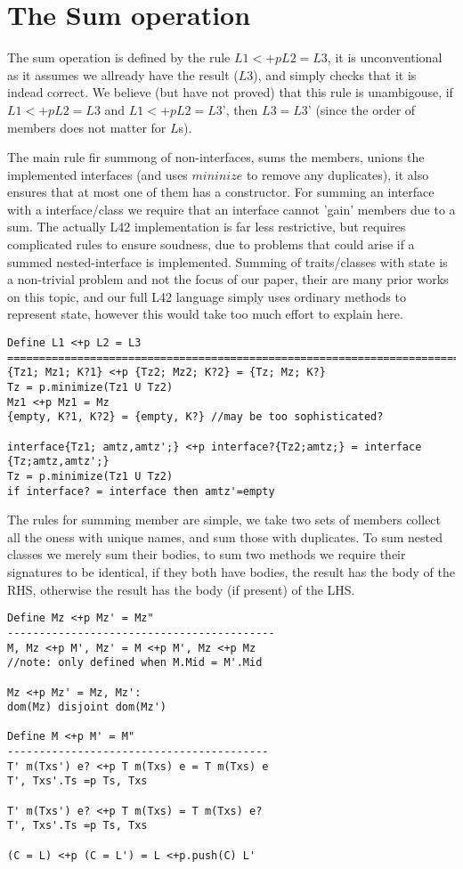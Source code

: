 \section{The Sum operation}

The sum operation is defined by the rule $L1 <+p L2 = L3$, it is unconventional as it assumes we allready have the result ($L3$), and simply checks that it is indead correct.
We believe (but have not proved) that this rule is unambigouse, if $L1 <+ p L2 = L3$ and $L1 <+ p L2 = L3’$, then $L3 = L3’$ (since the order of members does not matter for $L$s).

The main rule fir summong of non-interfaces, sums the members, unions the implemented interfaces (and uses $mininize$ to remove any duplicates), it also ensures that at most one of them has a constructor.
For summing an interface with a interface/class we require that an interface cannot ’gain’ members due to a sum. The actually L42 implementation is far less restrictive, but requires complicated rules to ensure soudness, due to problems that could arise if a summed nested-interface is implemented.
Summing of traits/classes with state is a non-trivial problem and not the focus of our paper, their are many prior works on this topic, and our full L42 language simply uses ordinary methods to represent state, however this would take too much effort to explain here.


\begin{verbatim}
Define L1 <+p L2 = L3
========================================================================================
{Tz1; Mz1; K?1} <+p {Tz2; Mz2; K?2} = {Tz; Mz; K?}
Tz = p.minimize(Tz1 U Tz2)
Mz1 <+p Mz1 = Mz
{empty, K?1, K?2} = {empty, K?} //may be too sophisticated?

interface{Tz1; amtz,amtz';} <+p interface?{Tz2;amtz;} = interface {Tz;amtz,amtz';}
Tz = p.minimize(Tz1 U Tz2)
if interface? = interface then amtz'=empty
\end{verbatim}

The rules for summing member are simple, we take two sets of members collect all the oness with unique names, and sum those with duplicates.
To sum nested classes we merely sum their bodies, to sum two methods we require their signatures to be identical, if they both have bodies, the result has the body of the RHS, otherwise the result has the body (if present) of the LHS.
\begin{verbatim}
Define Mz <+p Mz' = Mz"
------------------------------------------
M, Mz <+p M', Mz' = M <+p M', Mz <+p Mz
//note: only defined when M.Mid = M'.Mid

Mz <+p Mz' = Mz, Mz':
dom(Mz) disjoint dom(Mz')

Define M <+p M' = M"
-----------------------------------------
T' m(Txs') e? <+p T m(Txs) e = T m(Txs) e
T', Txs'.Ts =p Ts, Txs

T' m(Txs') e? <+p T m(Txs) = T m(Txs) e?
T', Txs'.Ts =p Ts, Txs

(C = L) <+p (C = L') = L <+p.push(C) L'
\end{verbatim}

